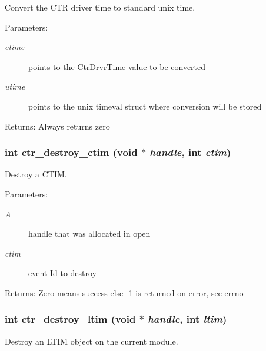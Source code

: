 Convert the CTR driver time to standard unix time. 

\begin{Desc}
\item[Parameters:]
\begin{description}
\item[{\em ctime}]points to the Ctr\-Drvr\-Time value to be converted \item[{\em utime}]points to the unix timeval struct where conversion will be stored \end{description}
\end{Desc}
\begin{Desc}
\item[Returns:]Always returns zero \end{Desc}
\subsubsection{\setlength{\rightskip}{0pt plus 5cm}int ctr\_\-destroy\_\-ctim (void $\ast$ {\em handle}, int {\em ctim})}\label{libctr_8doxygen_d67727479978f309e40a175f47331611}


Destroy a CTIM. 

\begin{Desc}
\item[Parameters:]
\begin{description}
\item[{\em A}]handle that was allocated in open \item[{\em ctim}]event Id to destroy \end{description}
\end{Desc}
\begin{Desc}
\item[Returns:]Zero means success else -1 is returned on error, see errno \end{Desc}
\subsubsection{\setlength{\rightskip}{0pt plus 5cm}int ctr\_\-destroy\_\-ltim (void $\ast$ {\em handle}, int {\em ltim})}\label{libctr_8doxygen_f0394d80d81f6b9a1c58c99731d3121a}


Destroy an LTIM object on the current module. 

